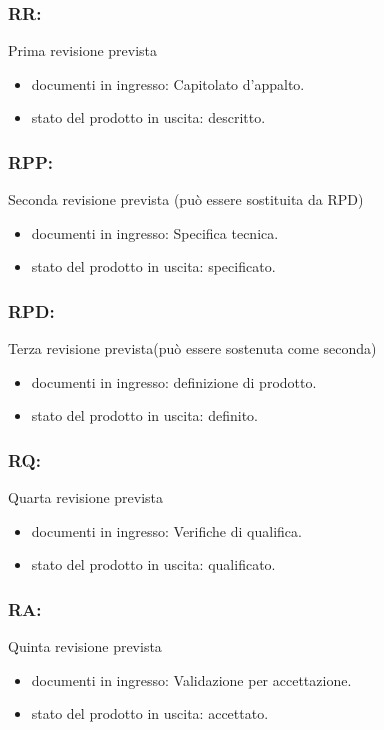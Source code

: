 \subsubsection*{RR:}  Prima revisione prevista 
\begin{itemize}
\item documenti in ingresso: Capitolato d'appalto.
\item stato del prodotto in uscita: descritto. 
\end{itemize}

\subsubsection*{RPP:} Seconda revisione prevista (pu\`o essere sostituita
da RPD)
\begin{itemize}
\item documenti in ingresso: Specifica tecnica.
\item stato del prodotto in uscita: specificato. 
\end{itemize}

\subsubsection*{RPD:} Terza revisione prevista(pu\`o essere sostenuta come
seconda)
\begin{itemize}
\item documenti in ingresso: definizione di prodotto.
\item stato del prodotto in uscita: definito. 
\end{itemize}

\subsubsection*{RQ:} Quarta revisione prevista
\begin{itemize}
\item documenti in ingresso: Verifiche di qualifica.
\item stato del prodotto in uscita: qualificato. 
\end{itemize}

\subsubsection*{RA:} Quinta revisione prevista
\begin{itemize}
\item documenti in ingresso: Validazione per accettazione.
\item stato del prodotto in uscita: accettato. 
\end{itemize}


